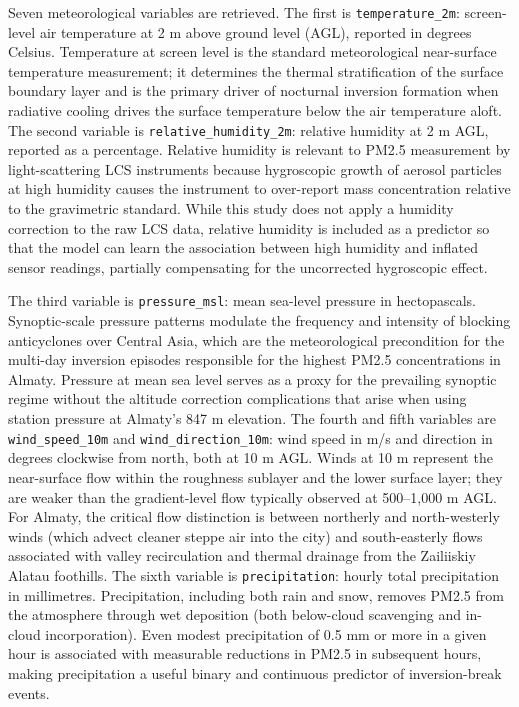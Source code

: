 Seven meteorological variables are retrieved. The first is \texttt{temperature\_2m}: screen-level air temperature at 2 m above ground level (AGL), reported in degrees Celsius. Temperature at screen level is the standard meteorological near-surface temperature measurement; it determines the thermal stratification of the surface boundary layer and is the primary driver of nocturnal inversion formation when radiative cooling drives the surface temperature below the air temperature aloft. The second variable is \texttt{relative\_humidity\_2m}: relative humidity at 2 m AGL, reported as a percentage. Relative humidity is relevant to PM2.5 measurement by light-scattering LCS instruments because hygroscopic growth of aerosol particles at high humidity causes the instrument to over-report mass concentration relative to the gravimetric standard. While this study does not apply a humidity correction to the raw LCS data, relative humidity is included as a predictor so that the model can learn the association between high humidity and inflated sensor readings, partially compensating for the uncorrected hygroscopic effect.

The third variable is \texttt{pressure\_msl}: mean sea-level pressure in hectopascals. Synoptic-scale pressure patterns modulate the frequency and intensity of blocking anticyclones over Central Asia, which are the meteorological precondition for the multi-day inversion episodes responsible for the highest PM2.5 concentrations in Almaty. Pressure at mean sea level serves as a proxy for the prevailing synoptic regime without the altitude correction complications that arise when using station pressure at Almaty's 847 m elevation. The fourth and fifth variables are \texttt{wind\_speed\_10m} and \texttt{wind\_direction\_10m}: wind speed in m/s and direction in degrees clockwise from north, both at 10 m AGL. Winds at 10 m represent the near-surface flow within the roughness sublayer and the lower surface layer; they are weaker than the gradient-level flow typically observed at 500--1,000 m AGL. For Almaty, the critical flow distinction is between northerly and north-westerly winds (which advect cleaner steppe air into the city) and south-easterly flows associated with valley recirculation and thermal drainage from the Zailiiskiy Alatau foothills. The sixth variable is \texttt{precipitation}: hourly total precipitation in millimetres. Precipitation, including both rain and snow, removes PM2.5 from the atmosphere through wet deposition (both below-cloud scavenging and in-cloud incorporation). Even modest precipitation of 0.5 mm or more in a given hour is associated with measurable reductions in PM2.5 in subsequent hours, making precipitation a useful binary and continuous predictor of inversion-break events.

